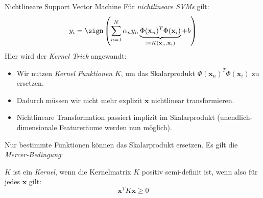 \begin{defi}{Nichtlineare Support Vector Machine}
    Für \emph{nichtlineare SVMs} gilt:
    \[
        y_i = \sign \left( \sum_{n=1}^N \alpha_n y_n \underbrace{\Phi(\mathbf{x}_n)^T \Phi(\mathbf{x}_i)}_{:= K(\mathbf{x}_n, \mathbf{x}_i)} + b \right)
    \]
    Hier wird der \emph{Kernel Trick} angewandt:
    \begin{itemize}
        \item Wir nutzen \emph{Kernel Funktionen} $K$, um das Skalarprodukt $\Phi(\mathbf{x}_n)^T \Phi(\mathbf{x}_i)$ zu ersetzen.
        \item Dadurch müssen wir nicht mehr explizit $\mathbf{x}$ nichtlinear transformieren.
        \item Nichtlineare Transformation passiert implizit im Skalarprodukt (unendlich-dimensionale Featureräume werden nun möglich).
    \end{itemize}

    Nur bestimmte Funktionen können das Skalarprodukt ersetzen.
    Es gilt die \emph{Mercer-Bedingung}:

    $K$ ist ein \emph{Kernel}, wenn die Kernelmatrix $K$ positiv semi-definit ist, wenn also für jedes $\mathbf{x}$ gilt:
    \[
        \mathbf{x}^T K \mathbf{x} \geq 0
    \]
\end{defi}

